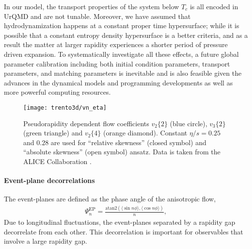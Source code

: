 In our model, the transport properties of the system below $T_c$ is all encoded in UrQMD and are not tunable. 
Moreover, we have assumed that hydrodynamization happens at a constant proper time hypersurface;
while it is possible that a constant entropy density hypersurface is a better criteria, and as a result the matter at larger rapidity experiences a shorter period of pressure driven expansion.
To systematically investigate all these effects, a future global parameter calibration including both initial condition parameters, transport parameters, and matching parameters is inevitable and is also feasible given the advances in the dynamical models and programming developments as well as more powerful computing resources.

\begin{figure}
\singlespacing 
\texttt{[image: trento3d/vn\_eta]}
\caption[Pseudorapidity dependent flow coefficients $v_2\{2\}$ (blue circle), ]{Pseudorapidity dependent flow coefficients $v_2\{2\}$ (blue circle), $v_3\{2\}$ (green triangle) and $v_2\{4\}$ (orange diamond).
Constant $\eta/s=0.25$ and $0.28$ are used for ``relative skewness'' (closed symbol) and ``absolute skewness'' (open symbol) ansatz. Data is taken from the ALICE Collaboration \cite{Adam:2016ows}.}
\label{fig:trento:vn_eta}
\end{figure}

\paragraph{Event-plane decorrelations} The event-planes are defined as the phase angle of the anisotropic flow,
\begin{eqnarray}
\Psi_n^\text{EP} = \frac{\text{atan2}(\langle \sin n \phi \rangle, \langle\cos n \phi \rangle)}{n},
\end{eqnarray}
Due to longitudinal fluctuations, the event-planes separated by a rapidity gap decorrelate from each other.
This decorrelation is important for observables that involve a large rapidity gap.

